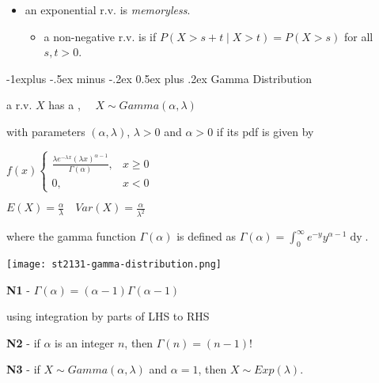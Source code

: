 \documentclass[10pt, landscape]{article}
\makeatletter
\renewcommand{\subsection}{\@startsection{subsection}{2}{0mm}%
  {-1explus -.5ex minus -.2ex}%
  {0.5ex plus .2ex}%
{\normalfont\normalsize\bfseries}}
\makeatother
\begin{document}
\begin{multicols*}{3}
  \begin{itemize}
    \item an exponential r.v. is \textit{memoryless}.
      \begin{itemize}
        \item a non-negative r.v. is  if $P(X > s + t \mid X > t) = P(X > s)$ for all  $s, t > 0$.
      \end{itemize}
  \end{itemize}

  \subsection{Gamma Distribution}

  a r.v. $X$ has a , $\quad X \sim Gamma(\alpha, \lambda)$ 

  with parameters $(\alpha, \lambda)$, $\lambda > 0$ and $\alpha > 0$ if its pdf is given by 

  \begin{tightcenter}
    $f(x) \begin{cases} \frac{\lambda e^{-\lambda x}(\lambda x)^{\alpha - 1}}{\Gamma(\alpha)} , &x \geq 0 \\ 0, &x < 0 \end{cases} $

    $E(X) = \frac{\alpha}{\lambda} \quad Var(X) = \frac{\alpha}{\lambda^2}$
  \end{tightcenter}

  where the gamma function $\Gamma(\alpha)$ is defined as 
  $\Gamma (\alpha) = \int^\infty_0 e^{-y} y^{\alpha - 1} \mathop{dy} $.

  \begin{minipage}[c]{0.4\linewidth}
    \begin{tightcenter}
      \texttt{[image: st2131-gamma-distribution.png]} 
    \end{tightcenter}
  \end{minipage}
  \begin{minipage}[c]{0.55\linewidth}
    \textbf{N1} - $\Gamma(\alpha) = (\alpha - 1) \Gamma(\alpha-1) $
    \begin{niceproof}
      using integration by parts of LHS to RHS
    \end{niceproof}

    \textbf{N2} - if $\alpha$ is an integer $n$, then $\Gamma(n) = (n-1)!$

    \textbf{N3} - if $X \sim Gamma(\alpha, \lambda)$ and $\alpha = 1$, then $X \sim Exp(\lambda)$.
  \end{minipage}


\end{multicols*}
\end{document}
